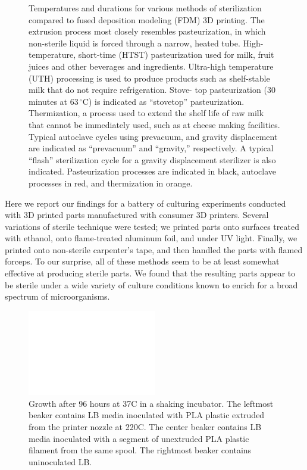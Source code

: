\documentclass[fleqn,10pt]{wlpeerj}
\begin{document}
\begin{figure}
    \caption{Temperatures and durations for various methods of sterilization
compared to fused deposition modeling (FDM) 3D printing. The extrusion process
most closely resembles pasteurization, in which non-sterile liquid is forced
through a narrow, heated tube. High- temperature, short-time (HTST)
pasteurization used for milk, fruit juices and other beverages and
ingredients. Ultra-high temperature (UTH) processing is used to produce
products such as shelf-stable milk that do not require refrigeration. Stove-
top pasteurization (30 minutes at 63$\,^{\circ}\mathrm{C}$) is indicated as
``stovetop'' pasteurization. Thermization, a process used to extend the shelf
life of raw milk that cannot be immediately used, such as at cheese making
facilities. Typical autoclave cycles using prevacuum, and gravity displacement
are indicated as ``prevacuum'' and ``gravity,'' respectively. A typical
``flash'' sterilization cycle for a gravity displacement sterilizer is also
indicated. Pasteurization processes are indicated in black, autoclave
processes in red, and thermization in orange.} 

\label{fig:pasteurization}
\end{figure}

Here we report our findings for a battery of culturing experiments conducted
with 3D printed parts manufactured with consumer 3D printers. Several
variations of sterile technique were tested; we printed parts onto surfaces
treated with ethanol, onto flame-treated aluminum foil, and under UV light.
Finally, we printed onto non-sterile carpenter's tape, and then handled the
parts with flamed forceps. To our surprise, all of these methods seem to be at
least somewhat effective at producing sterile parts. We found that the
resulting parts appear to be sterile under a wide variety of culture
conditions known to enrich for a broad spectrum of microorganisms.

\begin{figure}
  \centering
    \includegraphics[width=0.5\textwidth]{Fig2}

    \caption{ Growth after 96 hours at 37C in a shaking incubator. The 
    leftmost beaker contains LB media inoculated with PLA plastic extruded
    from the printer nozzle at 220C. The center beaker contains LB media
    inoculated with a segment of unextruded PLA plastic filament from the same
    spool. The rightmost beaker contains uninoculated LB.}
    
    \label{fig:preliminary}
\end{figure}
\end{document}
